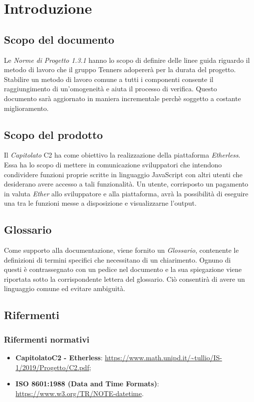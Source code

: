 \section{Introduzione}

\subsection{Scopo del documento}
Le \textit{Norme di Progetto 1.3.1\doc} hanno lo scopo di definire delle linee guida riguardo il metodo di lavoro che il gruppo Tenners adopererà per la durata del progetto. Stabilire un metodo di lavoro comune a tutti i componenti consente il raggiungimento di un'omogeneità e aiuta il processo di verifica. Questo documento sar\`a aggiornato in maniera incrementale perchè soggetto a costante miglioramento.

\subsection{Scopo del prodotto}
Il \textit{Capitolato\glo} C2 ha come obiettivo la realizzazione della piattaforma \textit{Etherless}. Essa ha lo scopo di mettere in comunicazione sviluppatori che intendono condividere funzioni proprie scritte in linguaggio JavaScript con altri utenti che desiderano avere accesso a tali funzionalità. Un utente, corrisposto un pagamento in valuta \textit{Ether\glo} allo sviluppatore e alla piattaforma, avrà la possibilità di eseguire una tra le funzioni messe a disposizione e visualizzarne l'output.

\subsection{Glossario}
Come supporto alla documentazione, viene fornito un \textit{Glossario}\docs,
contenente le definizioni di termini specifici che necessitano di un chiarimento.
Ognuno di questi è contrassegnato con un pedice \glo nel documento e la sua
spiegazione viene riportata sotto la corrispondente lettera del glossario. Ciò
consentir\`a di avere un linguaggio comune ed evitare ambiguità.

\subsection{Rifermenti}
\subsubsection{Rifermenti normativi}
\begin{itemize}
  \item \textbf{Capitolato\glo C2 - Etherless}: \url{https://www.math.unipd.it/~tullio/IS-1/2019/Progetto/C2.pdf};
  \item \textbf{ISO 8601:1988 (Data and Time Formats)}: \url {https://www.w3.org/TR/NOTE-datetime}.  
\end{itemize}

